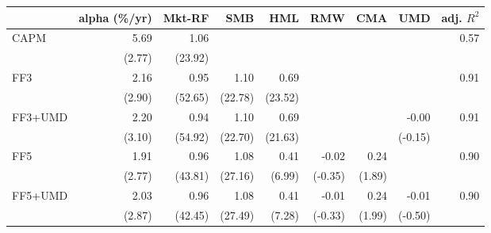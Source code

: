 \begin{tabular}{lrrrrrrrr}
\toprule
 & alpha (\%/yr) & Mkt-RF & SMB & HML & RMW & CMA & UMD & adj. $R^2$ \\
\midrule
CAPM & 5.69 & 1.06 &  &  &  &  &  & 0.57 \\
 & (2.77) & (23.92) &  &  &  &  &  &  \\[2pt]
FF3 & 2.16 & 0.95 & 1.10 & 0.69 &  &  &  & 0.91 \\
 & (2.90) & (52.65) & (22.78) & (23.52) &  &  &  &  \\[2pt]
FF3+UMD & 2.20 & 0.94 & 1.10 & 0.69 &  &  & -0.00 & 0.91 \\
 & (3.10) & (54.92) & (22.70) & (21.63) &  &  & (-0.15) &  \\[2pt]
FF5 & 1.91 & 0.96 & 1.08 & 0.41 & -0.02 & 0.24 &  & 0.90 \\
 & (2.77) & (43.81) & (27.16) & (6.99) & (-0.35) & (1.89) &  &  \\[2pt]
FF5+UMD & 2.03 & 0.96 & 1.08 & 0.41 & -0.01 & 0.24 & -0.01 & 0.90 \\
 & (2.87) & (42.45) & (27.49) & (7.28) & (-0.33) & (1.99) & (-0.50) &  \\[2pt]
\bottomrule
\end{tabular}
